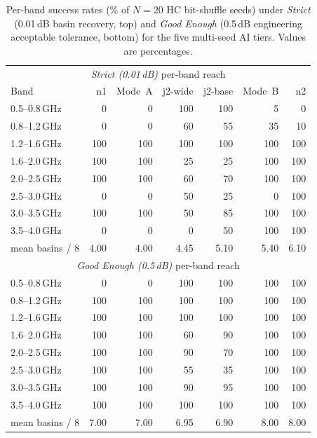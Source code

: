 \begin{table}[t]
\centering
\caption[Per-band Strict vs Good Enough success rates (24-bit, multi-seed)]{Per-band success rates (\% of $N{=}20$ HC bit-shuffle seeds)
under \emph{Strict} (0.01\,dB basin recovery, top) and \emph{Good
Enough} (0.5\,dB engineering acceptable tolerance, bottom) for the
five multi-seed AI tiers. Values are percentages.}
\label{tab:per_band_rates}
\small
\setlength{\tabcolsep}{6pt}
\begin{tabular}{lrrrrrr}
\toprule
\multicolumn{7}{c}{\emph{Strict (0.01\,dB)} per-band reach}\\
Band            & n1  & Mode~A & j2-wide & j2-base & Mode~B & n2  \\
\midrule
0.5--0.8\,GHz   & 0   & 0      & 100     & 100     & 5      & 0   \\
0.8--1.2\,GHz   & 0   & 0      & 60      & 55      & 35     & 10  \\
1.2--1.6\,GHz   & 100 & 100    & 100     & 100     & 100    & 100 \\
1.6--2.0\,GHz   & 100 & 100    & 25      & 25      & 100    & 100 \\
2.0--2.5\,GHz   & 100 & 100    & 60      & 70      & 100    & 100 \\
2.5--3.0\,GHz   & 0   & 0      & 50      & 25      & 0      & 100 \\
3.0--3.5\,GHz   & 100 & 100    & 50      & 85      & 100    & 100 \\
3.5--4.0\,GHz   & 0   & 0      & 0       & 50      & 100    & 100 \\
\midrule
mean basins / 8 & 4.00 & 4.00 & 4.45 & 5.10 & 5.40 & 6.10 \\
\midrule
\multicolumn{7}{c}{\emph{Good Enough (0.5\,dB)} per-band reach}\\
\midrule
0.5--0.8\,GHz   & 0   & 0      & 100     & 100     & 100    & 100 \\
0.8--1.2\,GHz   & 100 & 100    & 100     & 100     & 100    & 100 \\
1.2--1.6\,GHz   & 100 & 100    & 100     & 100     & 100    & 100 \\
1.6--2.0\,GHz   & 100 & 100    & 60      & 90      & 100    & 100 \\
2.0--2.5\,GHz   & 100 & 100    & 90      & 70      & 100    & 100 \\
2.5--3.0\,GHz   & 100 & 100    & 55      & 35      & 100    & 100 \\
3.0--3.5\,GHz   & 100 & 100    & 90      & 95      & 100    & 100 \\
3.5--4.0\,GHz   & 100 & 100    & 100     & 100     & 100    & 100 \\
\midrule
mean basins / 8 & 7.00 & 7.00 & 6.95 & 6.90 & 8.00 & 8.00 \\
\bottomrule
\end{tabular}
\end{table}

